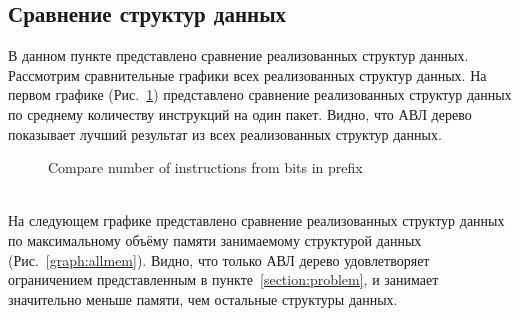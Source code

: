 \documentclass[conference]{IEEEtran}
\begin{document}
        \subsection{Сравнение структур данных}
            В данном пункте представлено сравнение реализованных структур данных. Рассмотрим сравнительные графики всех реализованных структур данных.
            На первом графике (Рис.~\ref{graph:allinst}) представлено сравнение реализованных структур данных по среднему количеству инструкций на один пакет. Видно, что АВЛ дерево показывает лучший результат
            из всех реализованных структур данных.
            \\
            \begin{figure}[ht]
                \centering
                \captionsetup{justification=centering}
                \caption{Compare number of instructions from bits in prefix}
                \label{graph:allinst}
            \end{figure}
            \\
            На следующем графике представлено сравнение реализованных структур данных по максимальному объёму памяти занимаемому структурой данных (Рис.~\ref{graph:allmem}). Видно, что только АВЛ дерево удовлетворяет
            ограничением представленным в пункте~\ref{section:problem}, и занимает значительно меньше памяти, чем остальные структуры данных.
            \\
\end{document}
